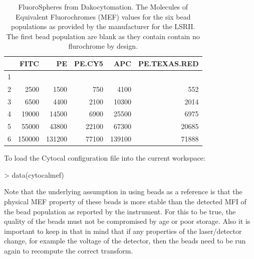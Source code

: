 \documentclass[11pt]{article}
\begin{document}
\begin{table}[ht]
\begin{center}
\begin{tabular}{rrrrrr}
  \hline
 & FITC & PE & PE.CY5 & APC & PE.TEXAS.RED \\ 
  \hline
1 &  &  &  &  &  \\ 
  2 & 2500 & 1500 & 750 & 4100 & 552 \\ 
  3 & 6500 & 4400 & 2100 & 10300 & 2014 \\ 
  4 & 19000 & 14500 & 6900 & 25500 & 6975 \\ 
  5 & 55000 & 43800 & 22100 & 67300 & 20685 \\ 
  6 & 150000 & 131200 & 77100 & 139100 & 71888 \\ 
   \hline
\end{tabular}
\caption{
             FluoroSpheres from Dakocytomation.
             The Molecules of Equivalent Fluorochromes (MEF) values for the six bead populations as provided by the manufacturer
             for the LSRII.
             The first bead population are blank as they contain contain no flurochrome by design.
             }
\end{center}
\end{table}
\noindent
To load the Cytocal configuration file into the current workspace:
\begin{Schunk}
\begin{Sinput}
> data(cytocalmef)
\end{Sinput}
\end{Schunk}

Note that the underlying assumption in using beads as a reference is that the physical MEF property of these beads is more stable
than the detected MFI of the bead population as reported by the instrument.
For this to be true, the quality of the beads must not be compromised by age or poor storage. 
Also it is important to keep in that in mind that if any properties of the laser/detector change, for example the voltage of the detector,
then the beads need to be run again to recompute the correct transform.


\end{document}
